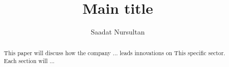 \documentclass[9pt,oneside]{amsart}
\title{Main title}
\author{
  Saadat Nursultan
}
\begin{document}
\maketitle
\begin{abstract}
  This paper will discuss how the company ... leads innovations on
  This specific sector. Each section will ...
\end{abstract}





\end{document}
